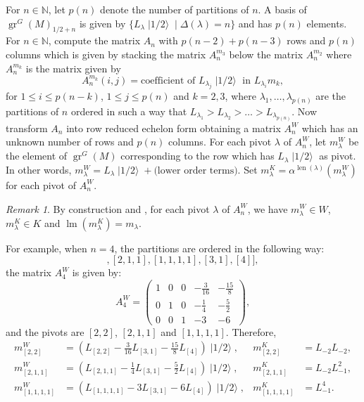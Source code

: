 \documentclass[a4paper, 12pt, reqno]{amsart}
\theoremstyle{remark}
\newtheorem{remark}[theorem]{Remark}
\DeclareMathOperator{\gr}{gr}
\DeclareMathOperator{\lm}{lm}
\DeclareMathOperator{\len}{len}
\DeclareMathOperator{\vachalf}{|1/2\rangle}
\begin{document}
For $n \in \mathbb{N}$, let $p(n)$ denote the number of partitions of $n$.
A basis of $\gr^G(M)_{1/2 + n}$ is given by $\{L_\lambda\vachalf \mid \Delta(\lambda) = n\}$ and has $p(n)$ elements. 
For $n \in \mathbb{N}$, compute the matrix $A_n$ with $p(n - 2) + p(n - 3)$ rows and $p(n)$ columns which is given by stacking the matrix $A^{m_3}_n$ below the matrix $A^{m_2}_n$ where $A^{m_k}_n$ is the matrix given by
\begin{equation*}
  A^{m_k}_n(i, j) = \text{coefficient of }L_{\lambda_j}\vachalf\text{ in }L_{\lambda_i}m_k,
\end{equation*}
for $1 \le i \le p(n - k)$, $1 \le j \le p(n)$ and $k = 2, 3$, where $\lambda_1, \dots, \lambda_{p(n)}$ are the partitions of $n$ ordered in such a way that $L_{\lambda_1} > L_{\lambda_2} > \dots > L_{\lambda_{p(n)}}$.
Now transform $A_n$ into row reduced echelon form obtaining a matrix $A^W_n$ which has an unknown number of rows and $p(n)$ columns.
For each pivot $\lambda$ of $A^W_n$, let $m^W_\lambda$ be the element of $\gr^G(M)$ corresponding to the row which has $L_\lambda\vachalf$ as pivot.
In other words, $m^W_\lambda = L_\lambda\vachalf + \text{(lower order terms)}$.
Set $m^K_\lambda = \alpha^{\len(\lambda)}(m^W_\lambda)$ for each pivot of $A^W_n$.

\begin{remark}
  \label{rmk:6}
  By construction and , for each pivot $\lambda$ of $A^W_n$, we have $m^W_\lambda \in W$, $m^K_\lambda \in K$ and $\lm(m^K_\lambda) = m_\lambda$.
\end{remark}

For example, when $n = 4$, the partitions are ordered in the following way:
  \begin{equation*}
    [[2, 2], [2, 1, 1], [1, 1, 1, 1], [3, 1], [4]],
  \end{equation*}
  the matrix $A^W_4$ is given by:
  \begin{equation*}
    A^W_4=
    \begin{pmatrix}
      1 & 0 & 0 & -\frac{3}{16} & -\frac{15}{8} \\
      0 & 1 & 0 & -\frac{1}{4} & -\frac{5}{2} \\
      0 & 0 & 1 & -3 & -6
    \end{pmatrix},
  \end{equation*}
  and the pivots are $[2, 2]$, $[2, 1, 1]$ and $[1, 1, 1, 1]$.
  Therefore,
  \begin{align*}
    m^W_{[2, 2]} &= (L_{[2, 2]} - \tfrac{3}{16}L_{[3, 1]} - \tfrac{15}{8}L_{[4]})\vachalf, &m^K_{[2, 2]} &= L_{-2}L_{-2}, \\
    m^W_{[2, 1, 1]} &= (L_{[2, 1, 1]} - \tfrac{1}{4}L_{[3, 1]} - \tfrac{5}{2}L_{[4]})\vachalf, &m^K_{[2, 1, 1]} &= L_{-2}L_{-1}^2, \\
    m^W_{[1, 1, 1, 1]} &= (L_{[1, 1, 1, 1]} - 3L_{[3, 1]} - 6L_{[4]})\vachalf, &m^K_{[1, 1, 1, 1]} &= L_{-1}^4.
  \end{align*}
  
\end{document}
